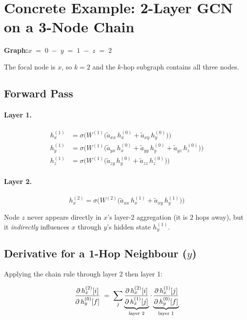 \documentclass[11pt]{article}
\begin{document}
\section{Concrete Example: 2-Layer GCN on a 3-Node Chain}

\textbf{Graph:}\quad $x \;{=}\; 0 \;-\; y \;{=}\; 1 \;-\; z \;{=}\; 2$

The focal node is $x$, so $k = 2$ and the $k$-hop subgraph contains all
three nodes.

\subsection{Forward Pass}

\paragraph{Layer 1.}
\begin{align}
  h_x^{(1)} &= \sigma\!\bigl(W^{(1)}\bigl(\tilde{a}_{xx}\,h_x^{(0)}
                + \tilde{a}_{xy}\,h_y^{(0)}\bigr)\bigr) \\[4pt]
  h_y^{(1)} &= \sigma\!\bigl(W^{(1)}\bigl(\tilde{a}_{yx}\,h_x^{(0)}
                + \tilde{a}_{yy}\,h_y^{(0)}
                + \tilde{a}_{yz}\,h_z^{(0)}\bigr)\bigr) \\[4pt]
  h_z^{(1)} &= \sigma\!\bigl(W^{(1)}\bigl(\tilde{a}_{zy}\,h_y^{(0)}
                + \tilde{a}_{zz}\,h_z^{(0)}\bigr)\bigr)
\end{align}

\paragraph{Layer 2.}
\begin{equation}
  h_x^{(2)} = \sigma\!\bigl(W^{(2)}\bigl(\tilde{a}_{xx}\,h_x^{(1)}
               + \tilde{a}_{xy}\,h_y^{(1)}\bigr)\bigr)
\end{equation}

Node $z$ never appears directly in $x$'s layer-2 aggregation (it is 2 hops
away), but it \emph{indirectly} influences $x$ through $y$'s hidden state
$h_y^{(1)}$.

\subsection{Derivative for a 1-Hop Neighbour ($y$)}

Applying the chain rule through layer 2 then layer 1:

\begin{equation}
  \frac{\partial\, h_x^{(2)}[i]}{\partial\, h_y^{(0)}[f]}
  \;=\;
  \sum_j
  \underbrace{%
    \frac{\partial\, h_x^{(2)}[i]}{\partial\, h_x^{(1)}[j]}
  }_{\text{layer 2}}
  \cdot
  \underbrace{%
    \frac{\partial\, h_x^{(1)}[j]}{\partial\, h_y^{(0)}[f]}
  }_{\text{layer 1}}
\end{equation}
\end{document}

